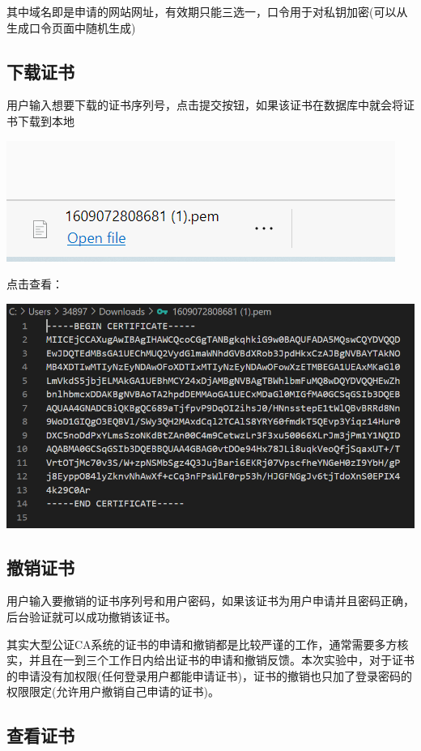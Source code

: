 \documentclass{ctexart}
\begin{document}
其中域名即是申请的网站网址，有效期只能三选一，口令用于对私钥加密(可以从生成口令页面中随机生成)


\subsection{下载证书}
用户输入想要下载的证书序列号，点击提交按钮，如果该证书在数据库中就会将证书下载到本地

\includegraphics[width=\textwidth]{Clipboard_2021-01-02-14-52-52.png}

点击查看：

\includegraphics[width=\textwidth]{Clipboard_2021-01-02-14-53-25.png}
\subsection{撤销证书}
用户输入要撤销的证书序列号和用户密码，如果该证书为用户申请并且密码正确，后台验证就可以成功撤销该证书。

其实大型公证CA系统的证书的申请和撤销都是比较严谨的工作，通常需要多方核实，并且在一到三个工作日内给出证书的申请和撤销反馈。本次实验中，对于证书的申请没有加权限(任何登录用户都能申请证书)，证书的撤销也只加了登录密码的权限限定(允许用户撤销自己申请的证书)。
\subsection{查看证书}
\end{document}
